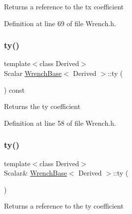 \begin{DoxyReturn}{Returns}
a reference to the {\ttfamily tx} coefficient 
\end{DoxyReturn}


Definition at line 69 of file Wrench.\+h.

\hypertarget{class_wrench_base_a7d574941740c725e035df6af20c0af6c}{}\label{class_wrench_base_a7d574941740c725e035df6af20c0af6c} 
\subsubsection{\texorpdfstring{ty()}{ty()}\hspace{0.1cm}{\footnotesize\ttfamily [1/2]}}
{\footnotesize\ttfamily template$<$class Derived$>$ \\
Scalar \hyperlink{class_wrench_base}{Wrench\+Base}$<$ Derived $>$\+::ty (\begin{DoxyParamCaption}{ }\end{DoxyParamCaption}) const\hspace{0.3cm}{\ttfamily [inline]}}

\begin{DoxyReturn}{Returns}
the {\ttfamily ty} coefficient 
\end{DoxyReturn}


Definition at line 58 of file Wrench.\+h.

\hypertarget{class_wrench_base_a304d93cdcd1b5aa6c40e2ef023ac4dc7}{}\label{class_wrench_base_a304d93cdcd1b5aa6c40e2ef023ac4dc7} 
\subsubsection{\texorpdfstring{ty()}{ty()}\hspace{0.1cm}{\footnotesize\ttfamily [2/2]}}
{\footnotesize\ttfamily template$<$class Derived$>$ \\
Scalar\& \hyperlink{class_wrench_base}{Wrench\+Base}$<$ Derived $>$\+::ty (\begin{DoxyParamCaption}{ }\end{DoxyParamCaption})\hspace{0.3cm}{\ttfamily [inline]}}

\begin{DoxyReturn}{Returns}
a reference to the {\ttfamily ty} coefficient 
\end{DoxyReturn}


